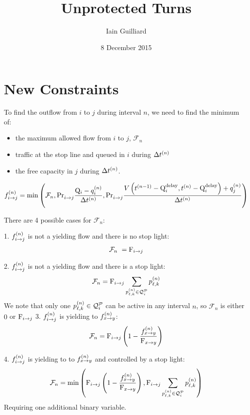 \documentclass[letterpaper]{article}
\newcommand{\Fmax}[1][n]{\ensuremath{\mathcal{F}_{#1}}\xspace}
\begin{document}
\title{Unprotected Turns}

\author{Iain Guilliard}
\date{8 December 2015}

\maketitle
\onecolumn
\section{New Constraints}
To find the outflow from $i$ to $j$ during interval $n$, we need to find the minimum of:
\begin{itemize}
\item  the maximum allowed flow from $i$ to $j$, $\Fmax$
\item traffic at the stop line and queued in $i$ during $\Delta t^{(n)}$
\item  the free capacity in $j$ during $\Delta t^{(n)}$.
\end{itemize}

\begin{align}
\f{i}{j} = \text{min}\left(\Fmax, \FTURN{i}{j} \frac{\QMAX{i} - \q{i}}{\DT},
\FTURN{i}{j} \frac{V\left(\tn[n-1] - \QDELAY{i},\tn - \QDELAY{i}\right) + \q{j}}{\DT}
\right)
\end{align}

There are 4 possible cases for $\Fmax$:

1. $f_{i\to j}^{(n)}$ is not a yielding flow and there is no stop light:
\begin{align}
\Fmax\ = \FMAX{i}{j}
\end{align}

2. $f_{i\to j}^{(n)}$ is not a yielding flow and there is a stop light:
\begin{align}
\Fmax = \FMAX{i}{j} \sum_{\p{\ell}{k} \in \QPset{i}}\p{\ell}{k}
\end{align}
We note that only one $p_{\ell,k}^{(n)} \in \mathcal{Q}_{i}^{\mathcal{P}}$ can be active in any interval $n$, so $\Fmax$ is either $0$ or $\mathrm{F}_{i\to j}$
3. $f_{i\to j}^{(n)}$ is yielding to $f_{x\to y}^{(n)}$:
\begin{align}
\Fmax = \FMAX{i}{j} \left(1 - \frac{\f{x}{y}}{\FMAX{x}{y}}\right)
\end{align}

4. $f_{i\to j}^{(n)}$ is yielding to to $f_{x\to y}^{(n)}$ and controlled by a stop light:
\begin{align}
\Fmax = \text{min}\left(
\FMAX{i}{j} \left(1 - \frac{\f{x}{y}}{\FMAX{x}{y}}\right),
\FMAX{i}{j} \sum_{\p{\ell}{k} \in \QPset{i}}\p{\ell}{k}
\right)
\end{align}
Requiring one additional binary variable.
\end{document}
